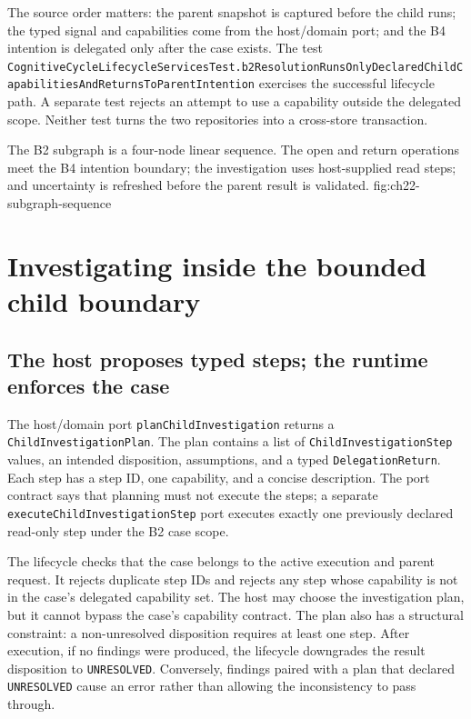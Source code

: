 The source order matters: the parent snapshot is captured before the child runs; the typed signal and capabilities come from the host/domain port; and the B4 intention is delegated only after the case exists. The test \texttt{Cognitive\allowbreak Cycle\allowbreak Lifecycle\allowbreak Services\allowbreak Test.\allowbreak b2\allowbreak Resolution\allowbreak Runs\allowbreak Only\allowbreak Declared\allowbreak Child\allowbreak Capabilities\allowbreak And\allowbreak Returns\allowbreak To\allowbreak Parent\allowbreak Intention} exercises the successful lifecycle path. A separate test rejects an attempt to use a capability outside the delegated scope. Neither test turns the two repositories into a cross-store transaction.

  {The B2 subgraph is a four-node linear sequence. The open and return operations meet the B4 intention boundary; the investigation uses host-supplied read steps; and uncertainty is refreshed before the parent result is validated.}
  {fig:ch22-subgraph-sequence}

\section{Investigating inside the bounded child boundary}
\label{sec:ch22-child-investigation}

\subsection{The host proposes typed steps; the runtime enforces the case}
\label{subsec:ch22-typed-steps}

The host/domain port \texttt{plan\allowbreak Child\allowbreak Investigation} returns a \texttt{Child\allowbreak Investigation\allowbreak Plan}. The plan contains a list of \texttt{Child\allowbreak Investigation\allowbreak Step} values, an intended disposition, assumptions, and a typed \texttt{Delegation\allowbreak Return}. Each step has a step ID, one capability, and a concise description. The port contract says that planning must not execute the steps; a separate \texttt{execute\allowbreak Child\allowbreak Investigation\allowbreak Step} port executes exactly one previously declared read-only step under the B2 case scope.

The lifecycle checks that the case belongs to the active execution and parent request. It rejects duplicate step IDs and rejects any step whose capability is not in the case's delegated capability set. The host may choose the investigation plan, but it cannot bypass the case's capability contract. The plan also has a structural constraint: a non-unresolved disposition requires at least one step. After execution, if no findings were produced, the lifecycle downgrades the result disposition to \texttt{UNRESOLVED}. Conversely, findings paired with a plan that declared \texttt{UNRESOLVED} cause an error rather than allowing the inconsistency to pass through.

